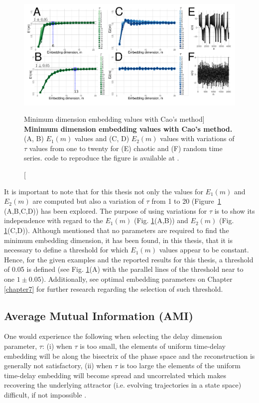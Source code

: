 \begin{figure}[!h]
  \centering
  \includegraphics[width=1.0\textwidth]{fig_3_03}
    \caption
	[Minimum dimension embedding values with Cao's method]{
	{\bf Minimum dimension embedding values with Cao's method.} 
	(A, B) $E_1 (m)$ values and (C, D) $E_2(m)$ values 
	with variations of $\tau$ values from one to twenty
	for (E) chaotic and (F) random time series.
	\R code to reproduce the figure is available at 
	.
	}
    \label{fig:e1e2}
\end{figure}

It is important to note that for this thesis not only the values for 
$E_1(m)$ and $E_2(m)$ are computed but also a variation of $\tau$ from 
1 to 20 (Figure~\ref{fig:e1e2} (A,B,C,D)) has been explored. 
The purpose of using variations for $\tau$ is to show its independence 
with regard to the $E_1(m)$ (Fig. \ref{fig:e1e2}(A,B))
and $E_2(m)$ (Fig. \ref{fig:e1e2}(C,D)).
Although \cite{Cao1997} mentioned that no parameters are required to find
the minimum embedding dimension, it has been found, in this thesis, 
that it is necessary to define a threshold for which $E_1(m)$ values 
appear to be constant. 
Hence, for the given examples and the reported results for this thesis,
a threshold of 0.05 is defined (see Fig. \ref{fig:e1e2}(A) 
with the parallel lines of the threshold near to one $1\pm0.05$).
Additionally, see optimal embedding parameters on
Chapter \ref{chapter7} for further research regarding the 
selection of such threshold.


\subsection{Average Mutual Information (AMI)}
One would experience the following when selecting 
the delay dimension parameter, $\tau$:
(i) when $\tau$ is too small, the elements of uniform time-delay embedding will be 
along the bisectrix of the phase space and the reconstruction is generally 
not satisfactory, 
(ii) when $\tau$ is too large the elements of the uniform 
time-delay embedding will become spread and uncorrelated which makes 
recovering the underlying attractor (i.e. evolving trajectories in a 
state space) difficult, if not impossible 
\citep{casdagli1991, emrani2014a, garcia2005e71}.

